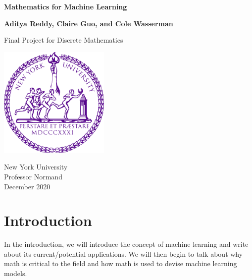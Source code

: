 \documentclass{article}
\begin{document}
\begin{titlepage}
   \begin{center}
       \vspace*{1cm}

       \huge \textbf{Mathematics for Machine Learning}

       \vspace{0.5cm}
        
            
       \vspace{1.5cm}

      
      \large \textbf{Aditya Reddy, Claire Guo, and Cole Wasserman}

      \vspace{35 mm}
            
       Final Project for Discrete Mathematics\\
            
       \vspace{0.8cm}
     
       \includegraphics[width=0.4\textwidth]{university}
        \vspace{20 mm}     
       
       New York University\\
       Professor Normand\\
       December 2020\
            
   \end{center}
\end{titlepage}

\pagestyle{fancy}
\fancyhf{}
\tableofcontents
\newpage

\section{Introduction}

In the introduction, we will introduce the concept of machine learning and write about its current/potential applications. We will then begin to talk about why math is critical to the field and how math is used to devise machine learning models.
\end{document}
